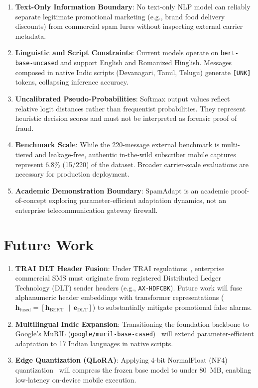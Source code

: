 \documentclass[conference]{IEEEtran}
\begin{document}
\begin{enumerate}
    \item \textbf{Text-Only Information Boundary}: No text-only NLP model can reliably separate legitimate promotional marketing (e.g., brand food delivery discounts) from commercial spam lures without inspecting external carrier metadata.
    \item \textbf{Linguistic and Script Constraints}: Current models operate on \texttt{bert-base-uncased} and support English and Romanized Hinglish. Messages composed in native Indic scripts (Devanagari, Tamil, Telugu) generate \texttt{[UNK]} tokens, collapsing inference accuracy.
    \item \textbf{Uncalibrated Pseudo-Probabilities}: Softmax output values reflect relative logit distances rather than frequentist probabilities. They represent heuristic decision scores and must not be interpreted as forensic proof of fraud.
    \item \textbf{Benchmark Scale}: While the 220-message external benchmark is multi-tiered and leakage-free, authentic in-the-wild subscriber mobile captures represent 6.8\% (15/220) of the dataset. Broader carrier-scale evaluations are necessary for production deployment.
    \item \textbf{Academic Demonstration Boundary}: SpamAdapt is an academic proof-of-concept exploring parameter-efficient adaptation dynamics, not an enterprise telecommunication gateway firewall.
\end{enumerate}

\section{Future Work}
\label{sec:future_work}

\begin{enumerate}
    \item \textbf{TRAI DLT Header Fusion}: Under TRAI regulations~\cite{trai2018tcccpr}, enterprise commercial SMS must originate from registered Distributed Ledger Technology (DLT) sender headers (e.g., \texttt{AX-HDFCBK}). Future work will fuse alphanumeric header embeddings with transformer representations ($\mathbf{h}_{\text{fused}} = [\mathbf{h}_{\text{BERT}} \,\|\, \mathbf{e}_{\text{DLT}}]$) to substantially mitigate promotional false alarms.
    \item \textbf{Multilingual Indic Expansion}: Transitioning the foundation backbone to Google's MuRIL (\texttt{google/muril-base-cased})~\cite{khanuja2021muril} will extend parameter-efficient adaptation to 17 Indian languages in native scripts.
    \item \textbf{Edge Quantization (QLoRA)}: Applying 4-bit NormalFloat (NF4) quantization~\cite{dettmers2024qlora} will compress the frozen base model to under 80~MB, enabling low-latency on-device mobile execution.
\end{enumerate}
\end{document}
